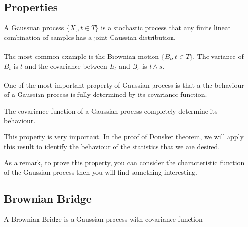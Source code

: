 \documentclass[final_project_1.tex]{subfiles}
\begin{document}
\subsection{Properties}
\begin{definition}
A Gaussuan process $\{X_t,t\in T\}$ is a stochastic process that any finite linear combination of samples has a joint Gaussian distribution.
\end{definition}

\paragraph{}
The most common example is the Brownian motion $\{B_t,t\in T\}$. The variance of $B_t$ is $t$ and the covariance between $B_t$ and $B_s$ is $t\wedge s$.

\paragraph{}
One of the most important property of Gaussian process is that a the behaviour of a Gaussian process is fully determined by its covariance function.
\begin{property}
The covariance function of a Gaussian process completely determine its behaviour.
\end{property}
This property is very important. In the proof of Donsker theorem, we will apply this result to identify the behaviour of the statistics that we are desired.

As a remark, to prove this property, you can consider the characteristic function of the Gaussian process then you will find something interesting.

\subsection{Brownian Bridge}
\begin{theorem}
A Brownian Bridge is a Gaussian process with covariance function	
\end{theorem}
\end{document}
